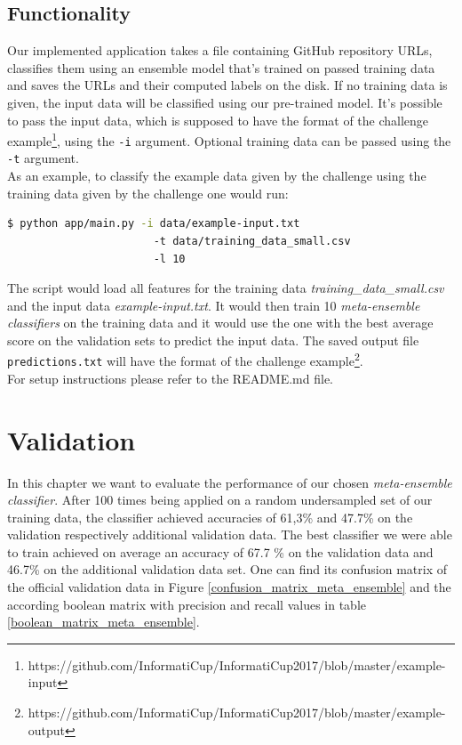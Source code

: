 \documentclass[%
a4paper,
DIV12,
2.5headlines,
bigheadings,
titlepage,
openbib,
]{scrartcl}
\begin{document}
\subsection{Functionality}\label{functionality}

Our implemented application takes a file containing GitHub repository URLs, classifies them using an ensemble model that's trained on passed training data and saves the URLs and their computed labels on the disk.
If no training data is given, the input data will be classified using our pre-trained model.
It's possible to pass the input data, which is supposed to have the format of the challenge example\footnote{https://github.com/InformatiCup/InformatiCup2017/blob/master/example-input}, using the \texttt{-i} argument.
Optional training data can be passed using the \texttt{-t} argument.\\
As an example, to classify the example data given by the challenge using the training data given by the challenge one would run:

\begin{lstlisting}[language=bash]
  $ python app/main.py -i data/example-input.txt
                       -t data/training_data_small.csv
                       -l 10
\end{lstlisting}

The script would load all features for the training data \textit{training\_data\_small.csv} and the input data \textit{example-input.txt}.
It would then train 10 \textit{meta-ensemble classifiers} on the training data and it would use the one with the best average score on the validation sets to predict the input data.
The saved output file \texttt{predictions.txt} will have the format of the challenge example\footnote{https://github.com/InformatiCup/InformatiCup2017/blob/master/example-output}.\\
For setup instructions please refer to the README.md file.

\section{Validation}\label{validation}

In this chapter we want to evaluate the performance of our chosen \textit{meta-ensemble classifier}.
After 100 times being applied on a random undersampled set of our training data, the classifier achieved accuracies of 61,3\% and 47.7\% on the validation respectively additional validation data.
The best classifier we were able to train achieved on average an accuracy of 67.7 \% on the validation data and 46.7\% on the additional validation data set.
One can find its confusion matrix of the official validation data in Figure \ref{confusion_matrix_meta_ensemble} and the according boolean matrix with precision and recall values in table \ref{boolean_matrix_meta_ensemble}.
\end{document}
